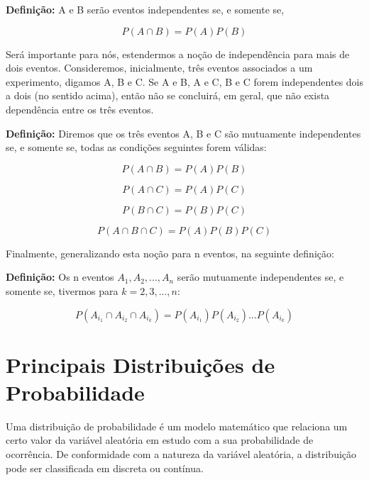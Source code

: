 \textbf{Definição:} A e B serão eventos independentes se, e
somente se,

$$
P(A \cap B) = P(A)P(B)
$$


Será importante para nós, estendermos a noção de independência
para mais de dois eventos. Consideremos, inicialmente, três
eventos associados a um experimento, digamos A, B e C. Se A e B, A
e C, B e C forem independentes dois a dois (no sentido acima),
então não se concluirá, em geral, que não exista dependência entre
os três eventos.\vskip0.3cm

\textbf{Definição:} Diremos que os três eventos A, B e C são
mutuamente independentes se, e somente se, todas as condições
seguintes forem válidas:

$$
P(A \cap B)=P(A)P(B)
$$

$$
P(A \cap C)=P(A)P(C)
$$

$$
P(B \cap C)=P(B)P(C)
$$

$$
P(A \cap B \cap C)=P(A)P(B)P(C)
$$


Finalmente, generalizando esta noção para n eventos, na seguinte
definição:\vskip0.3cm



\textbf{Definição:} Os n eventos $A_{1},A_{2},...,A_{n}$ serão
mutuamente independentes se, e somente se, tivermos para
$k=2,3,...,n$:

\begin{equation}\label{}
    P(A_{i_{1}} \cap A_{i_{2}} \cap A_{i_{k}})=
    P(A_{i_{1}})P(A_{i_{2}})...P(A_{i_{k}})
\end{equation}




















\newpage
\section{Principais Distribuições de Probabilidade}
 
 
\inic Uma distribuição de probabilidade é um modelo matemático que relaciona um certo valor da variável aleatória em estudo com a sua probabilidade de ocorrência. De conformidade com a natureza da variável aleatória, a distribuição pode ser classificada em discreta ou contínua.
 
